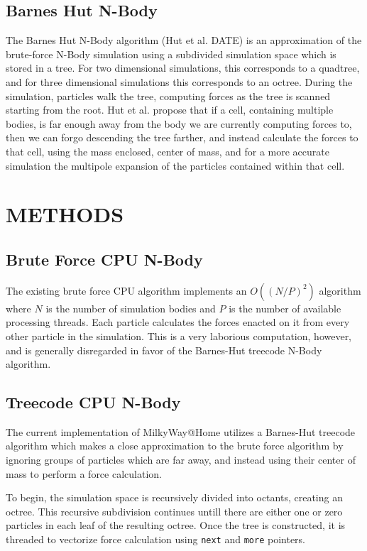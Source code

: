 \documentclass{thesis}
\begin{document}
\section{Barnes Hut N-Body}
The Barnes Hut N-Body algorithm (Hut et al. DATE) is an approximation of the brute-force N-Body simulation using a subdivided simulation space which is stored in a tree. For two dimensional simulations, this corresponds to a quadtree, and for three dimensional simulations this corresponds to an octree. During the simulation, particles walk the tree, computing forces as the tree is scanned starting from the root. Hut et al. propose that if a cell, containing multiple bodies, is far enough away from the body we are currently computing forces to, then we can forgo descending the tree farther, and instead calculate the forces to that cell, using the mass enclosed, center of mass, and for a more accurate simulation the multipole expansion of the particles contained within that cell.
\chapter{METHODS}
\section{Brute Force CPU N-Body}
The existing brute force CPU algorithm implements an $O((N/P)^2)$ algorithm where $N$ is the number of simulation bodies and $P$ is the number of available processing threads. Each particle calculates the forces enacted on it from every other particle in the simulation. This is a very laborious computation, however, and is generally disregarded in favor of the Barnes-Hut treecode N-Body algorithm.
\section{Treecode CPU N-Body}
The current implementation of MilkyWay@Home utilizes a Barnes-Hut treecode algorithm which makes a close approximation to the brute force algorithm by ignoring groups of particles which are far away, and instead using their center of mass to perform a force calculation.

To begin, the simulation space is recursively divided into octants, creating an octree. This recursive subdivision continues untill there are either one or zero particles in each leaf of the resulting octree. Once the tree is constructed, it is threaded to vectorize force calculation using \texttt{next} and \texttt{more} pointers.
\end{document}
